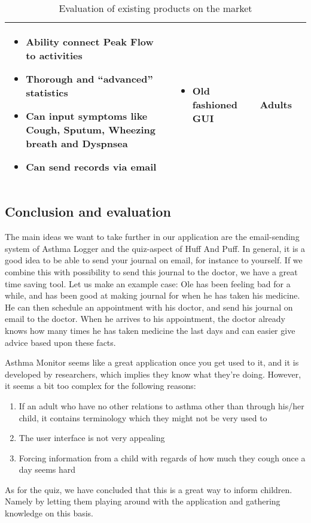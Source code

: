 \begin{sidewaystable}
\begin{tabular}{ | p{4.0cm} | p{5.5cm} | p{5.5cm} | p{4cm}|}
\begin{itemize}
	  \item Ability connect Peak Flow to activities
	  \item Thorough and ``advanced'' statistics
	  \item Can input symptoms like Cough, Sputum, Wheezing breath and Dyspnsea 
	  \item Can send records via email
	\end{itemize}
	&
	\begin{itemize}
	  \item Old fashioned GUI
	\end{itemize}
	& 
	Adults
	\\ \hline
	\end{tabular}
	\caption{Evaluation of existing products on the market}
\end{sidewaystable}

\subsection{Conclusion and evaluation}
\label{sec:existingconcl}

The main ideas we want to take further in our application are the email-sending system of Asthma Logger and the quiz-aspect of Huff And Puff. In general, it is a good idea to be able to send your journal on email, for instance to yourself. If we combine this with possibility to send this journal to the doctor, we have a great time saving tool. Let us make an example case: Ole has been feeling bad for a while, and has been good at making journal for when he has taken his medicine. He can then schedule an appointment with his doctor, and send his journal on email to the doctor. When he arrives to his appointment, the doctor already knows how many times he has taken medicine the last days and can easier give advice based upon these facts. 

Asthma Monitor seems like a great application once you get used to it, and it is developed by researchers, which implies they know what they're doing. However, it seems a bit too complex for the following reasons:
\begin{enumerate}
  \item If an adult who have no other relations to asthma other than through his/her child, it contains terminology which they might not be very used to
  \item The user interface is not very appealing
  \item Forcing information from a child with regards of how much they cough once a day seems hard 
\end{enumerate}   

As for the quiz, we have concluded that this is a great way to inform children. Namely by letting them playing around with the application and gathering knowledge on this basis. 



